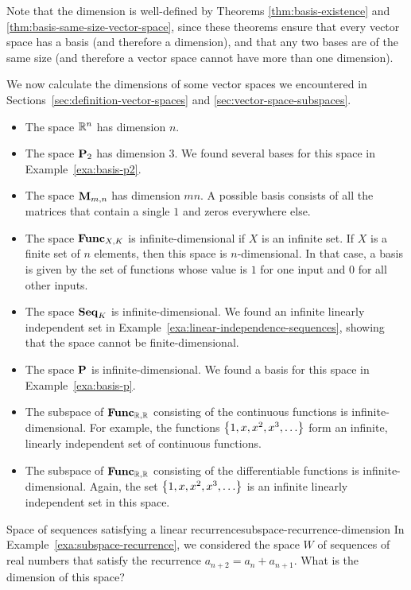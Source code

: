 Note that the dimension is well-defined by Theorems
{\ref{thm:basis-existence}} and
{\ref{thm:basis-same-size-vector-space}}, since these theorems ensure
that every vector space has a basis (and therefore a dimension), and
that any two bases are of the same size (and therefore a vector space
cannot have more than one dimension).

We now calculate the dimensions of some vector spaces we encountered in
Sections~\ref{sec:definition-vector-spaces} and
{\ref{sec:vector-space-subspaces}}.

\begin{itemize}
\item The space $\mathbb{R}^n$ has dimension $n$.
\item The space $\mathbf{P}_2$ has dimension $3$. We found several bases
  for this space in Example~\ref{exa:basis-p2}.
\item The space $\mathbf{M}_{m,n}$ has dimension $mn$. A possible basis
  consists of all the matrices that contain a single $1$ and zeros
  everywhere else.
\item The space $\mathbf{Func}_{X,K}$ is infinite-dimensional if $X$ is an
  infinite set. If $X$ is a finite set of $n$ elements, then this
  space is $n$-dimensional. In that case, a basis is given by the set
  of functions whose value is $1$ for one input and $0$ for all other
  inputs.
\item The space $\mathbf{Seq}_K$ is infinite-dimensional. We found an infinite
  linearly independent set in
  Example~\ref{exa:linear-independence-sequences}, showing that the
  space cannot be finite-dimensional.
\item The space $\mathbf{P}$ is infinite-dimensional. We found a basis for
  this space in Example~\ref{exa:basis-p}.
\item The subspace of $\mathbf{Func}_{\mathbb{R},\mathbb{R}}$ consisting of the continuous
  functions is infinite-dimensional. For example, the functions
  $\left\{1,x,x^2,x^3,\ldots\right\}$ form an infinite, linearly independent
  set of continuous functions.
\item The subspace of $\mathbf{Func}_{\mathbb{R},\mathbb{R}}$ consisting of the differentiable
  functions is infinite-dimensional. Again, the set
  $\left\{1,x,x^2,x^3,\ldots\right\}$ is an infinite linearly independent set
  in this space.
\end{itemize}

\begin{example}{Space of sequences satisfying a linear recurrence}{subspace-recurrence-dimension}
  In Example~\ref{exa:subspace-recurrence}, we considered the space
  $W$ of sequences of real numbers that satisfy the recurrence
  $a_{n+2}=a_n+a_{n+1}$. What is the dimension of this space?
\end{example}

